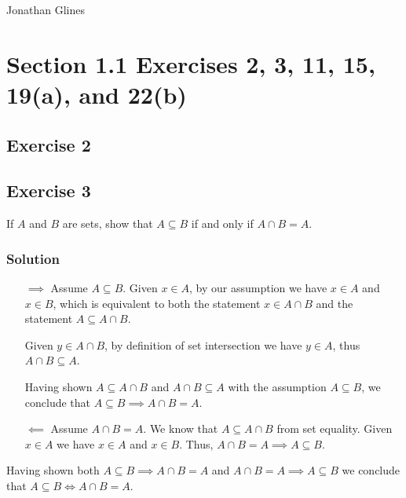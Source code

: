 \documentclass[12pt]{article}
\begin{document}
\begin{flushright}
\Large{Jonathan Glines}
\end{flushright}
\section*{Section 1.1 Exercises 2, 3, 11, 15, 19(a), and 22(b)}
\subsection*{Exercise 2}
\subsection*{Exercise 3}
If $A$ and $B$ are sets, show that $A \subseteq B$ if and only if $A \cap B = A$.
\subsubsection*{Solution}
%
%

\begin{itemize}
\item[$\implies$] Assume $A \subseteq B$. Given $x \in A$, by our assumption we have $x \in A$ and $x \in B$, which is equivalent to both the statement $x \in A \cap B$ and the statement $A \subseteq A \cap B$.

Given $y \in A \cap B$, by definition of set intersection we have $y \in A$, thus $A \cap B \subseteq A$.

Having shown $A \subseteq A \cap B$ and $A \cap B \subseteq A$ with the assumption $A \subseteq B$, we conclude that $A \subseteq B \implies A \cap B = A$.

\item[$\impliedby$] Assume $A \cap B = A$. We know that $A \subseteq A \cap B$ from set equality. Given $x \in A$ we have $x \in A$ and $x \in B$. Thus, $A \cap B = A \implies A \subseteq B$.
\end{itemize}
Having shown both $A \subseteq B \implies A \cap B = A$ and $A \cap B = A \implies A \subseteq B$ we conclude that $A \subseteq B \iff A \cap B = A$.
\end{document}
